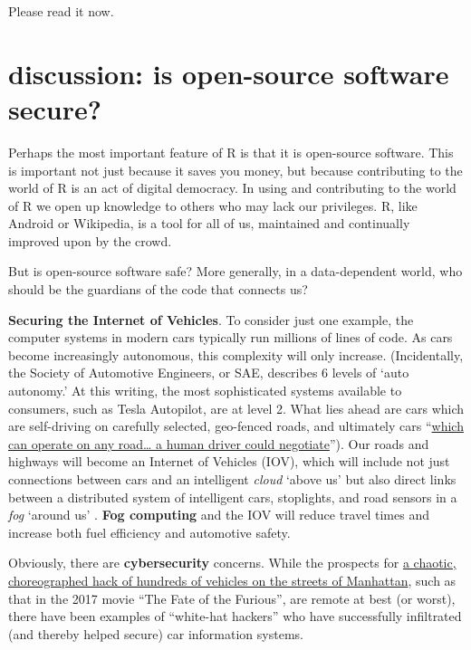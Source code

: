 \documentclass[
  openany]{book}
\begin{document}
Please read it now.

\hypertarget{discussion-is-open-source-software-secure}{%
\section{discussion: is open-source software secure?}\label{discussion-is-open-source-software-secure}}

Perhaps the most important feature of R is that it is open-source software. This is important not just because it saves you money, but because contributing to the world of R is an act of digital democracy. In using and contributing to the world of R we open up knowledge to others who may lack our privileges. R, like Android or Wikipedia, is a tool for all of us, maintained and continually improved upon by the crowd.

But is open-source software safe? More generally, in a data-dependent world, who should be the guardians of the code that connects us?

\textbf{Securing the Internet of Vehicles}. To consider just one example, the computer systems in modern cars typically run millions of lines of code. As cars become increasingly autonomous, this complexity will only increase. (Incidentally, the Society of Automotive Engineers, or SAE, describes 6 levels of `auto autonomy.' At this writing, the most sophisticated systems available to consumers, such as Tesla Autopilot, are at level 2. What lies ahead are cars which are self-driving on carefully selected, geo-fenced roads, and ultimately cars ``\href{https://www.caranddriver.com/features/a15079828/autonomous-self-driving-car-levels-car-levels/}{which can operate on any road\ldots{} a human driver could negotiate}''). Our roads and highways will become an Internet of Vehicles (IOV), which will include not just connections between cars and an intelligent \emph{cloud} `above us' but also direct links between a distributed system of intelligent cars, stoplights, and road sensors in a \emph{fog} `around us' \citep{bonomi2012fog}. \textbf{Fog computing} and the IOV will reduce travel times and increase both fuel efficiency and automotive safety.

Obviously, there are \textbf{cybersecurity} concerns. While the prospects for \href{https://www.youtube.com/watch?v=OvewYslou9g}{a chaotic, choreographed hack of hundreds of vehicles on the streets of Manhattan}, such as that in the 2017 movie ``The Fate of the Furious'', are remote at best (or worst), there have been examples of ``white-hat hackers'' who have successfully infiltrated (and thereby helped secure) car information systems.
\end{document}
